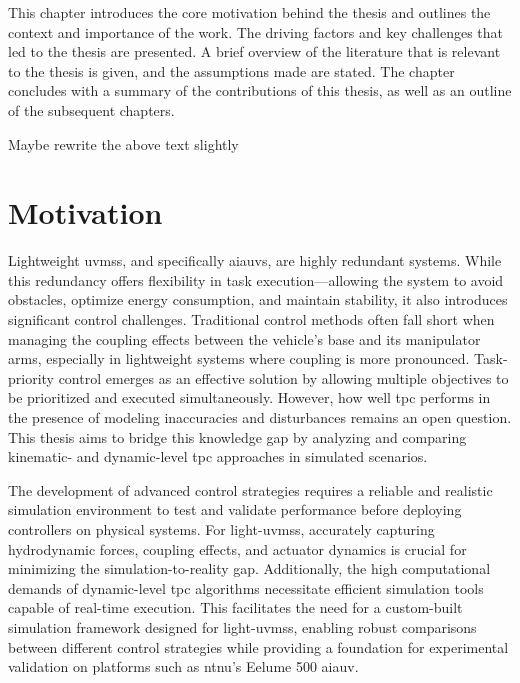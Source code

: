 \label{ch:introduction}
This chapter introduces the core motivation behind the thesis and outlines the
context and importance of the work. The driving factors and key challenges that
led to the thesis are presented. A brief overview of the literature that is
relevant to the thesis is given, and the assumptions made are
stated. The chapter concludes with a summary of the contributions of this thesis,
as well as an outline of the subsequent chapters.

{
    \color{red}
    Maybe rewrite the above text slightly
}


\section{Motivation}
\label{sec:introduction:motivation}

{
\color{red}
Lightweight \gls{uvms}s, and specifically \gls{aiauv}s, are highly redundant systems.
While this redundancy offers flexibility in task execution—allowing the system
to avoid obstacles, optimize 
energy consumption, and maintain stability, it also introduces significant 
control challenges. Traditional control methods often fall short when managing 
the coupling effects between the vehicle's base and its manipulator arms, 
especially in lightweight systems where coupling is more pronounced. 
Task-priority control emerges as an effective solution by allowing 
multiple objectives to be prioritized and executed simultaneously. However, how 
well \gls{tpc} performs in the presence of modeling inaccuracies and disturbances 
remains an open question. This thesis aims to bridge this knowledge gap by 
analyzing and comparing kinematic- and dynamic-level \gls{tpc} approaches in
simulated scenarios.

The development of advanced control strategies requires a reliable and 
realistic simulation environment to test and validate performance before 
deploying controllers on physical systems. For light-\gls{uvms}s, accurately 
capturing hydrodynamic forces, coupling effects, and actuator dynamics is 
crucial for minimizing the simulation-to-reality gap. Additionally, the high 
computational demands of dynamic-level \gls{tpc} algorithms necessitate efficient 
simulation tools capable of real-time execution. This facilitates the
need for a custom-built simulation framework designed for light-\gls{uvms}s, 
enabling robust comparisons between different control strategies while 
providing a foundation for experimental validation on platforms such as \gls{ntnu}’s 
Eelume 500 \gls{aiauv}.
}

